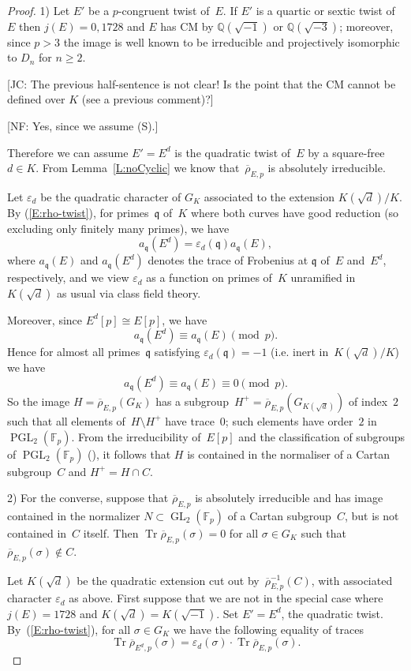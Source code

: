 \documentclass[12pt, reqno]{amsart}
\newcommand{\F}{\mathbb{F}}
\newcommand{\Q}{\mathbb{Q}}
\newcommand{\rhobar}{{\overline{\rho}}}
\newcommand{\frq}{{\mathfrak q}}
\newcommand{\eps}{\varepsilon}
\DeclareMathOperator{\Tr}{Tr}
\newcommand{\GL}{\operatorname{GL}}
\newcommand{\PGL}{\operatorname{PGL}}
\numberwithin{equation}{section}
\theoremstyle{definition}
\theoremstyle{remark}
\newcommand{\nf}[1]{{\color{blue} \textsf{[NF: #1]}}}
\newcommand{\jc}[1]{{\color{darkgreen} \textsf{[JC: #1]}}}
\begin{document}
\begin{proof} 1) Let $E'$ be a $p$-congruent twist of~$E$. If $E'$ is a quartic or sextic twist of~$E$ then $j(E)=0,1728$ and 
$E$ has CM by $\Q(\sqrt{-1})$ or $\Q(\sqrt{-3})$; moreover, since $p > 3$ the image is well known to be irreducible and projectively isomorphic to $D_n$ for $n \geq 2$. 

\jc{The previous half-sentence is not clear!  Is the point that the CM
cannot be defined over $K$ (see a previous comment)?}

\nf{Yes, since we assume (S).}

Therefore we can assume $E' = E^d$ 
is the quadratic twist of~$E$ by a square-free $d\in K$.
From Lemma~\ref{L:noCyclic} we know that~$\rhobar_{E,p}$ is absolutely irreducible. 

Let $\eps_d$ be the quadratic character of $G_K$ associated to the
extension $K(\sqrt{d})/K$. By (\ref{E:rho-twist}), for primes~$\frq$
of~$K$ where both curves have good reduction (so excluding only
finitely many primes), we have
\[
  a_\frq(E^d) = \eps_d(\frq) a_\frq(E),
\]
where $a_\frq(E)$ and $a_\frq(E^d)$ denotes the trace of Frobenius at
$\frq$ of~$E$ and~$E^d$, respectively, and we view $\eps_d$ as a
function on primes of~$K$ unramified in~$K(\sqrt{d})$ as usual via
class field theory.
  
Moreover, since $E^d[p]\cong
  E[p]$, we have
  \[
  a_\frq(E^d) \equiv a_\frq(E) \pmod{p}.
  \]
  Hence for almost all primes~$\frq$ satisfying $\eps_d(\frq) = -1$ (i.e. inert
  in~$K(\sqrt{d})/K$) we have
  \[
  a_\frq(E^d) \equiv a_\frq(E) \equiv0 \pmod{p}.
  \]
  So the image $H=\rhobar_{E,p}(G_K)$ has a
  subgroup~$H^+=\rhobar_{E,p}(G_{K(\sqrt{d})})$ of index~$2$ such that
  all elements of~$H\setminus H^+$ have trace~$0$;  such elements have
  order~$2$ in $\PGL_2(\F_p)$. From the
  irreducibility of~$E[p]$ and the classification of subgroups of $\PGL_2(\F_p)$ (\cite[Theorem XI.2.3]{LangModForms}), it follows that $H$ is contained in the
  normaliser of a Cartan subgroup~$C$ and $H^+=H\cap C$.

2) For the converse, suppose that $\rhobar_{E,p}$ is absolutely irreducible and has image contained in
the normalizer $N \subset \GL_2(\F_p)$ of a Cartan subgroup~$C$, but
is not contained in~$C$ itself. Then $\Tr \rhobar_{E,p}(\sigma) = 0$
for all $\sigma \in G_K$ such that $\rhobar_{E,p}(\sigma) \not\in C$.

Let $K(\sqrt{d})$ be the quadratic extension cut out
by~$\rhobar_{E,p}^{-1}(C)$, with associated character $\eps_d$ as
above.  First suppose that we are not in the special case where
$j(E)=1728$ and $K(\sqrt{d})=K(\sqrt{-1})$.  Set $E'=E^d$, the
quadratic twist.  By~(\ref{E:rho-twist}), for all $\sigma \in G_K$ we
have the following equality of traces
\[\Tr \rhobar_{{E^d},p}(\sigma) = \eps_d(\sigma) \cdot \Tr \rhobar_{E,p}(\sigma).\]


\end{proof}
\end{document}
